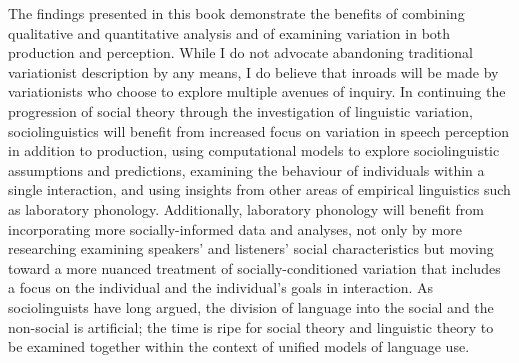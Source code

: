 The findings presented in this book demonstrate the benefits of combining qualitative and quantitative analysis and of examining variation in both production and perception.  While I do not advocate abandoning traditional variationist description by any means, I do believe that inroads will be made by variationists who choose to explore multiple avenues of inquiry.  In continuing the progression of social theory through the investigation of linguistic variation, sociolinguistics will benefit from increased focus on variation in speech perception in addition to production, using computational models to explore sociolinguistic assumptions and predictions, examining the behaviour of individuals within a single interaction, and using insights from other areas of empirical linguistics such as laboratory phonology.  Additionally, laboratory phonology will benefit from incorporating more socially-informed data and analyses, not only by more researching examining speakers' and listeners' social characteristics but moving toward a more nuanced treatment of socially-conditioned variation that includes a focus on the individual and the individual's goals in interaction. As sociolinguists have long argued, the division of language into the social and the non-social is artificial; the time is ripe for social theory and linguistic theory to be examined together within the context of unified models of language use.